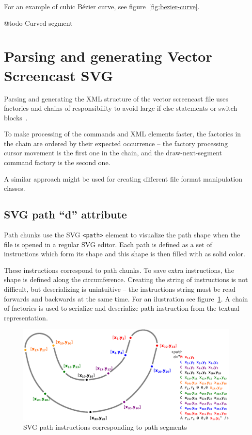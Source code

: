 For an example of cubic Bézier curve, see figure~\ref{fig:bezier-curve}.

@todo Curved segment




\section{Parsing and generating Vector Screencast SVG}
Parsing and generating the XML structure of the vector screencast file uses factories and chains of responsibility to avoid large if-else statements or switch blocks~\cite{gang_of_four}.

To make processing of the commands and XML elements faster, the factories in the chain are ordered by their expected occurrence -- the factory processing cursor movement is the first one in the chain, and the draw-next-segment command factory is the second one.

A similar approach might be used for creating different file format manipulation classes.

\subsection{SVG path ``d'' attribute}
\label{sec:path_serialization}
Path chunks use the SVG \verb|<path>| element to visualize the path shape when the file is opened in a regular SVG editor. Each path is defined as a set of instructions which form its shape and this shape is then filled with as solid color.

These instructions correspond to path chunks. To save extra instructions, the shape is defined along the circumference. Creating the string of instructions is not difficult, but deserializing is unintuitive -- the instructions string must be read forwards and backwards at the same time. For an ilustration see figure~\ref{fig:parsing_path}. A chain of factories is used to serialize and deserialize path instruction from the textual representation.

\begin{figure}
	\centering
		\includegraphics[width=130mm]{../img/path_serialization.eps}
		\caption{SVG path instructions corresponding to path segments\label{fig:parsing_path}}		
\end{figure}



